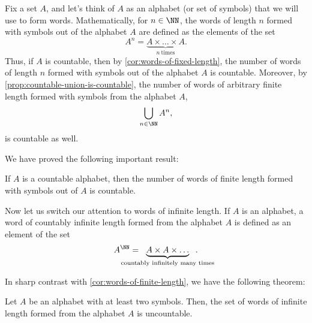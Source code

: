 Fix a set $A$, and let’s think of $A$ as an alphabet (or set of symbols) that we will use to form words.
Mathematically,  for $n\in \NN$, the words of length $n$ formed with symbols out of the alphabet $A$ are defined  as the elements of the set
\[
  A^n = \underbrace{A\times \dots \times A}_{n\ \text{times}}.
\]
Thus, if $A$ is countable, then by \cref{cor:words-of-fixed-length}, the number of words of length $n$ formed with symbols out of the alphabet $A$ is countable.
Moreover, by \cref{prop:countable-union-is-countable}, the number of words of arbitrary finite length formed with symbols from  the alphabet $A$,
\[
  \bigcup_{n\in\NN} A^n,
\]
is countable as well.

We have proved the following important result:

\begin{corollary}
  \label{cor:words-of-finite-length}
  If $A$ is a countable alphabet, then the number of words of finite length formed with symbols out of  $A$ is countable.
\end{corollary}

Now let us switch our attention to words of infinite length.
If $A$ is an alphabet, a word of countably infinite length formed from the alphabet $A$ is defined as an element of the set
\[
  A^{\NN} = \hspace{-24pt} \underbrace{A\times A\times \dots }_{\text{countably infinitely many times}} \hspace{-24pt}.
\]

In sharp contrast with \cref{cor:words-of-finite-length}, we have the following theorem:

\begin{theorem}
  \label{thm:words-of-infinite-length}
  Let $A$ be an alphabet with at least two symbols.
  Then, the set of words of infinite length formed from the alphabet $A$ is uncountable.
\end{theorem}

